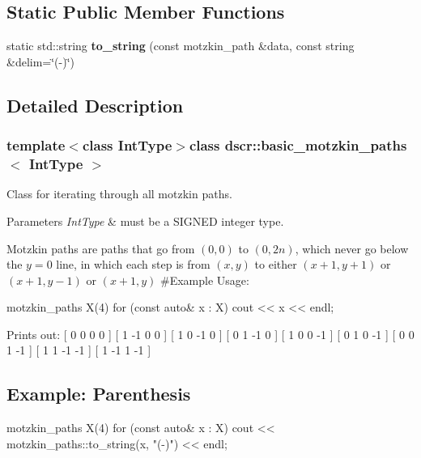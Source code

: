 \subsection*{Static Public Member Functions}
\begin{DoxyCompactItemize}
\item 
\hypertarget{classdscr_1_1basic__motzkin__paths_ad94c386b02725a4c402bc34bc26f1067}{static std\-::string {\bfseries to\-\_\-string} (const motzkin\-\_\-path \&data, const string \&delim=\char`\"{}(-\/)\char`\"{})}\label{classdscr_1_1basic__motzkin__paths_ad94c386b02725a4c402bc34bc26f1067}

\end{DoxyCompactItemize}


\subsection{Detailed Description}
\subsubsection*{template$<$class Int\-Type$>$class dscr\-::basic\-\_\-motzkin\-\_\-paths$<$ Int\-Type $>$}

Class for iterating through all motzkin paths. 


\begin{DoxyParams}{Parameters}
{\em Int\-Type} & must be a S\-I\-G\-N\-E\-D integer type.\\
\hline
\end{DoxyParams}
Motzkin paths are paths that go from $(0,0)$ to $(0,2n)$, which never go below the $ y=0$ line, in which each step is from $(x,y)$ to either $(x+1,y+1)$ or $(x+1,y-1)$ or $(x+1,y)$ \#\-Example Usage\-: \begin{DoxyVerb}motzkin_paths X(4)
for (const auto& x : X)
    cout << x << endl;
\end{DoxyVerb}
 Prints out\-: \mbox{[} 0 0 0 0 \mbox{]} \mbox{[} 1 -\/1 0 0 \mbox{]} \mbox{[} 1 0 -\/1 0 \mbox{]} \mbox{[} 0 1 -\/1 0 \mbox{]} \mbox{[} 1 0 0 -\/1 \mbox{]} \mbox{[} 0 1 0 -\/1 \mbox{]} \mbox{[} 0 0 1 -\/1 \mbox{]} \mbox{[} 1 1 -\/1 -\/1 \mbox{]} \mbox{[} 1 -\/1 1 -\/1 \mbox{]}

\subsection*{Example\-: Parenthesis}

\begin{DoxyVerb}motzkin_paths X(4)
for (const auto& x : X)
    cout << motzkin_paths::to_string(x, "(-)") << endl;
\end{DoxyVerb}


